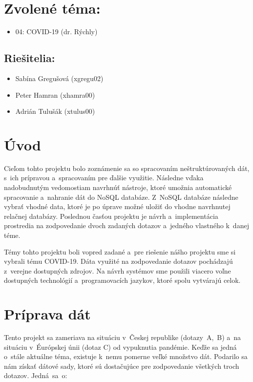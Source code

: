 \documentclass [11pt, a4paper]{article}
\begin{document}
\section*{Zvolené téma:} 
\begin{itemize}[noitemsep]
\item 04: COVID-19 (dr. Rýchly)
\end{itemize}


\subsection*{Riešitelia:}
\begin{itemize}[noitemsep]
\item Sabína Gregušová (xgregu02)
\item Peter Hamran (xhamra00)
\item Adrián Tulušák (xtulus00)
\end{itemize}

\section*{Úvod}
Cieľom tohto projektu bolo zoznámenie sa so spracovaním neštruktúrovaných dát, s~ich prípravou a~spracovaním pre ďalšie využitie. Následne vďaka nadobudnutým vedomostiam navrhnúť nástroje, ktoré umožnia automatické spracovanie a~nahranie dát do NoSQL databáze. Z~NoSQL databáze následne vybrať vhodné data, ktoré je po úprave možné uložiť do vhodne navrhnutej relačnej databázy. Poslednou časťou projektu je návrh a~implementácia prostredia na zodpovedanie dvoch zadaných dotazov a~jedného vlastného k~danej téme. 

Témy tohto projektu boli vopred zadané a~pre riešenie nášho projektu sme si vybrali tému COVID-19. Dáta využité na zodpovedanie dotazov pochádzajú z~verejne dostupných zdrojov. Na návrh systémov sme použili viacero voľne dostupných technológií a~programovacích jazykov, ktoré spolu vytvárajú celok. 
\section*{Príprava dát}

Tento projekt sa zameriava na situáciu v~Českej republike (dotazy~A,~B) a~na situáciu v~Éurópskej únii (dotaz C) od vypuknutia pandémie. Keďže sa jedná o~stále aktuálne téma, existuje k~nemu pomerne veľké množstvo dát. Podarilo sa nám získať dátové sady, ktoré sú dostačujúce pre zodpovedanie všetkých troch dotazov. Jedná~sa~o:
\end{document}
